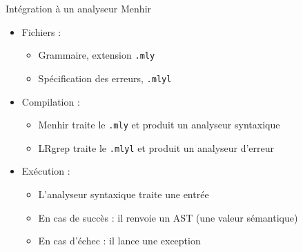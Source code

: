 \documentclass{beamer}          %
\begin{document}
\begin{frame}{Intégration à un analyseur Menhir}

  \begin{itemize}
    \item Fichiers :
      \begin{itemize}
      \item Grammaire, extension \texttt{.mly}
      \item<2-> Spécification des erreurs, \texttt{.mlyl}
      \end{itemize}
    \item Compilation :
      \begin{itemize}
        \item Menhir traite le \texttt{.mly} et produit un analyseur syntaxique
        \item<2-> LRgrep traite le \texttt{.mlyl} et produit un analyseur d'erreur
      \end{itemize}
    \item Exécution :
      \begin{itemize}
        \item L'analyseur syntaxique traite une entrée
        \item En cas de succès : il renvoie un AST (une valeur sémantique)
        \item En cas d'échec : il lance une exception \\
      \end{itemize}
  \end{itemize}

\end{frame}

%
%
\end{document}
